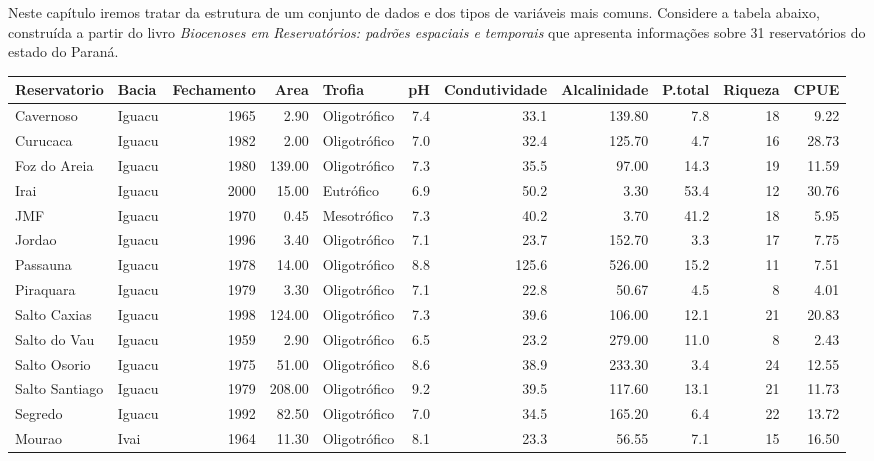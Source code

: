 \documentclass[
]{book}
\begin{document}
Neste capítulo iremos tratar da estrutura de um conjunto de dados e dos tipos de variáveis mais comuns. Considere a tabela abaixo, construída a partir do livro \emph{Biocenoses em Reservatórios: padrões espaciais e temporais} \citep{rodriguesetal2005} que apresenta informações sobre 31 reservatórios do estado do Paraná.

\begin{table}
\centering\begingroup\fontsize{8}{10}\selectfont

\begin{tabular}{llrrlrrrrrr}
\toprule
Reservatorio & Bacia & Fechamento & Area & Trofia & pH & Condutividade & Alcalinidade & P.total & Riqueza & CPUE\\
\midrule
Cavernoso & Iguacu & 1965 & 2.90 & Oligotrófico & 7.4 & 33.1 & 139.80 & 7.8 & 18 & 9.22\\
Curucaca & Iguacu & 1982 & 2.00 & Oligotrófico & 7.0 & 32.4 & 125.70 & 4.7 & 16 & 28.73\\
Foz do Areia & Iguacu & 1980 & 139.00 & Oligotrófico & 7.3 & 35.5 & 97.00 & 14.3 & 19 & 11.59\\
Irai & Iguacu & 2000 & 15.00 & Eutrófico & 6.9 & 50.2 & 3.30 & 53.4 & 12 & 30.76\\
JMF & Iguacu & 1970 & 0.45 & Mesotrófico & 7.3 & 40.2 & 3.70 & 41.2 & 18 & 5.95\\
\addlinespace
Jordao & Iguacu & 1996 & 3.40 & Oligotrófico & 7.1 & 23.7 & 152.70 & 3.3 & 17 & 7.75\\
Passauna & Iguacu & 1978 & 14.00 & Oligotrófico & 8.8 & 125.6 & 526.00 & 15.2 & 11 & 7.51\\
Piraquara & Iguacu & 1979 & 3.30 & Oligotrófico & 7.1 & 22.8 & 50.67 & 4.5 & 8 & 4.01\\
Salto Caxias & Iguacu & 1998 & 124.00 & Oligotrófico & 7.3 & 39.6 & 106.00 & 12.1 & 21 & 20.83\\
Salto do Vau & Iguacu & 1959 & 2.90 & Oligotrófico & 6.5 & 23.2 & 279.00 & 11.0 & 8 & 2.43\\
\addlinespace
Salto Osorio & Iguacu & 1975 & 51.00 & Oligotrófico & 8.6 & 38.9 & 233.30 & 3.4 & 24 & 12.55\\
Salto Santiago & Iguacu & 1979 & 208.00 & Oligotrófico & 9.2 & 39.5 & 117.60 & 13.1 & 21 & 11.73\\
Segredo & Iguacu & 1992 & 82.50 & Oligotrófico & 7.0 & 34.5 & 165.20 & 6.4 & 22 & 13.72\\
Mourao & Ivai & 1964 & 11.30 & Oligotrófico & 8.1 & 23.3 & 56.55 & 7.1 & 15 & 16.50\\

\end{tabular}
\end{table}
\end{document}
